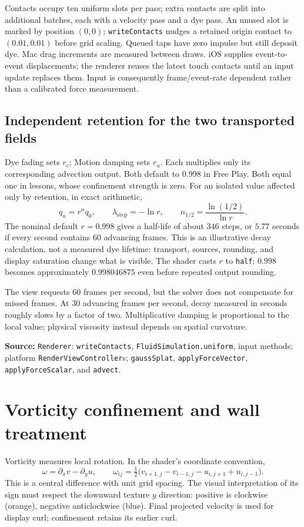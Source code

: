 \documentclass[11pt,a4paper]{article}
\newcommand{\src}[1]{\par{\footnotesize\raggedright\color{teal}\textbf{Source:} #1\par}}
\newcommand{\code}[1]{\texttt{#1}}
\newcommand{\page}[1]{\clearpage\section{#1}}
\begin{document}
Contacts occupy ten uniform slots per pass; extra contacts are split into
additional batches, each with a velocity pass and a dye pass. An unused slot is
marked by position $(0,0)$; \code{writeContacts} nudges a retained origin contact
to $(0.01,0.01)$ before grid scaling. Queued taps have zero impulse but still
deposit dye. Mac drag increments are measured between draws. iOS supplies
event-to-event displacements; the renderer reuses the latest touch contacts
until an input update replaces them. Input is consequently frame/event-rate
dependent rather than a calibrated force measurement.

\subsection*{Independent retention for the two transported fields}
Dye fading sets $r_c$; Motion damping sets $r_u$. Each multiplies only its corresponding advection output. Both default to $0.998$ in Free Play. Both equal one in lessons, whose confinement strength is zero.
For an isolated value affected only by retention, in exact arithmetic,
\begin{equation}
 q_n=r^nq_0,\qquad
 \lambda_{\mathrm{step}}=-\ln r,\qquad
 n_{1/2}=\frac{\ln(1/2)}{\ln r}.
\end{equation}
The nominal default $r=0.998$ gives a half-life of about $346$ steps, or $5.77$
seconds if every second contains 60 advancing frames. This is an illustrative
decay calculation, not a measured dye lifetime: transport, sources, rounding,
and display saturation change what is visible. The shader casts $r$ to
\code{half}; $0.998$ becomes approximately $0.998046875$ even before repeated
output rounding.

The view requests 60 frames per second, but the solver does not compensate for
missed frames. At 30 advancing frames per second, decay measured in seconds
roughly slows by a factor of two. Multiplicative damping is proportional to the
local value; physical viscosity instead depends on spatial curvature.
\src{\code{Renderer}: \code{writeContacts}, \code{FluidSimulation.uniform}, input methods;
platform \code{RenderViewController}s; \code{gaussSplat}, \code{applyForceVector},
\code{applyForceScalar}, and \code{advect}.}

\page{Vorticity confinement and wall treatment}
Vorticity measures local rotation. In the shader's coordinate convention,
\begin{equation}
 \omega=\partial_xv-\partial_yu,\qquad
 \omega_{ij}=\tfrac12\bigl(v_{i+1,j}-v_{i-1,j}
                         -u_{i,j+1}+u_{i,j-1}\bigr).
\end{equation}
This is a central difference with unit grid spacing. The visual interpretation
of its sign must respect the downward texture $y$ direction: positive is clockwise (orange), negative anticlockwise (blue). Final projected velocity is used for display curl; confinement retains its earlier curl.
\end{document}
